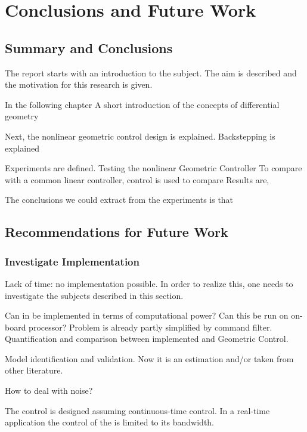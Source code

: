 \chapter{Conclusions and Future Work}\label{ch:conclusion}

\section{Summary and Conclusions}
The report starts with an introduction to the subject.
The aim is described and the motivation for this research is given.

In the following chapter
A short introduction of the concepts of differential geometry

Next, the nonlinear geometric control design is explained.
Backstepping is explained

Experiments are defined.
Testing the nonlinear Geometric Controller
To compare with a common linear controller,  control is used to compare
Results are,

The conclusions we could extract from the experiments is that

\section{Recommendations for Future Work}\label{ch:future}

\subsection{Investigate Implementation}
Lack of time: no implementation possible. In order to realize this, one needs to investigate the subjects described in this section.

Can in be implemented in terms of computational power? Can this be run on on-board processor?
Problem is already partly simplified by command filter. Quantification and comparison between implemented  and Geometric Control.

Model identification and validation. Now it is an estimation and/or taken from other literature.

How to deal with noise?

The control is designed assuming continuous-time control. In a real-time application the control of the  is limited to its bandwidth. 

